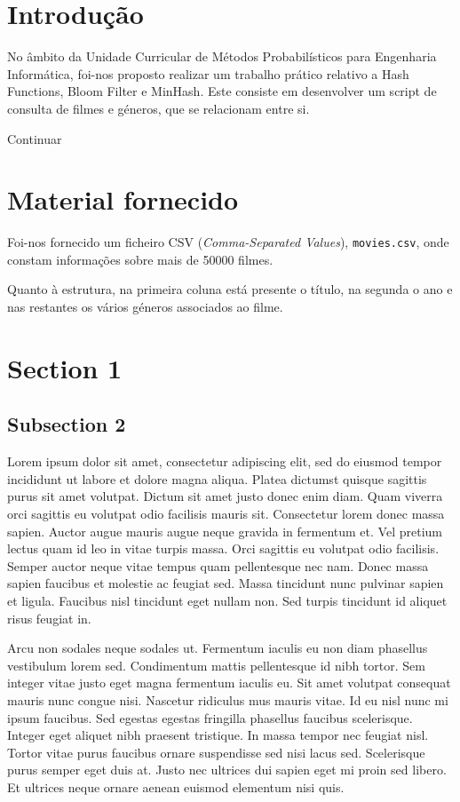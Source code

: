\documentclass[portuguese, 11pt, a4paper,titlepage, oneside]{article}
\title{
  \texttt{[image: assets/logo-deti-black.pdf]}
  \vskip 2.5em
  \Huge Métodos Probabilísticos para\\
  Engenharia Informática
  \vskip .7em
	{\bfseries Guião PL04}
  \vskip 1.5em
  \normalsize Ano letivo 2023/2024
  \vskip 0.5em
  Turma P4
}
\author{Ricardo Quintaneiro\\NMec: 110056\and Rúben Garrido\\NMec: 107927}
\date{\today}
\begin{document}
\maketitle

\tableofcontents
\pagebreak

\section{Introdução}
No âmbito da Unidade Curricular de Métodos Probabilísticos para Engenharia Informática, foi-nos proposto realizar um trabalho prático relativo a Hash Functions, Bloom Filter e MinHash. Este consiste em desenvolver um script de consulta de filmes e géneros, que se relacionam entre si.

Continuar

\section{Material fornecido}
Foi-nos fornecido um ficheiro CSV (\textit{Comma-Separated Values}), \verb|movies.csv|, onde constam informações sobre mais de 50000 filmes.

Quanto à estrutura, na primeira coluna está presente o título, na segunda o ano e nas restantes os vários géneros associados ao filme.

\pagebreak
\section{Section 1}
\subsection{Subsection 2}
Lorem ipsum dolor sit amet, consectetur adipiscing elit, sed do eiusmod tempor incididunt ut labore et dolore magna aliqua. Platea dictumst quisque sagittis purus sit amet volutpat. Dictum sit amet justo donec enim diam. Quam viverra orci sagittis eu volutpat odio facilisis mauris sit. Consectetur lorem donec massa sapien. Auctor augue mauris augue neque gravida in fermentum et. Vel pretium lectus quam id leo in vitae turpis massa. Orci sagittis eu volutpat odio facilisis. Semper auctor neque vitae tempus quam pellentesque nec nam. Donec massa sapien faucibus et molestie ac feugiat sed. Massa tincidunt nunc pulvinar sapien et ligula. Faucibus nisl tincidunt eget nullam non. Sed turpis tincidunt id aliquet risus feugiat in.

Arcu non sodales neque sodales ut. Fermentum iaculis eu non diam phasellus vestibulum lorem sed. Condimentum mattis pellentesque id nibh tortor. Sem integer vitae justo eget magna fermentum iaculis eu. Sit amet volutpat consequat mauris nunc congue nisi. Nascetur ridiculus mus mauris vitae. Id eu nisl nunc mi ipsum faucibus. Sed egestas egestas fringilla phasellus faucibus scelerisque. Integer eget aliquet nibh praesent tristique. In massa tempor nec feugiat nisl. Tortor vitae purus faucibus ornare suspendisse sed nisi lacus sed. Scelerisque purus semper eget duis at. Justo nec ultrices dui sapien eget mi proin sed libero. Et ultrices neque ornare aenean euismod elementum nisi quis.
\end{document}

